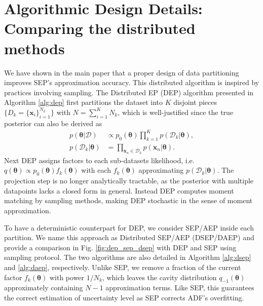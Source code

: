 \documentclass{article} %
\begin{document}
\section{Algorithmic Design Details: Comparing the distributed methods}
We have shown in the main paper that a proper design of data partitioning improves SEP's approximation accuracy. This distributed algorithm is inspired by practices involving sampling. The Distributed EP (DEP) algorithm \cite{gelman:dep}\cite{xu:sms} presented in Algorithm \ref{alg:dep} first partitions the dataset into $K$ disjoint pieces $\{ D_k = \{\bm{x}_i\}_{i=1}^{N_k} \}$ with $N = \sum_{i=1}^K N_k$, which is well-justified since the true posterior can also be derived as
\begin{align}
p(\bm{\theta}|\mathcal{D}) &\propto p_0(\bm{\theta}) \prod_{k=1}^K p(\mathcal{D}_k|\bm{\theta}), \\
p(\mathcal{D}_k|\bm{\theta}) &= \prod_{\bm{x}_n \in \mathcal{D}_k} p(\bm{x}_n | \bm{\theta}).
\end{align}
%
Next DEP assigns factors to each sub-datasets likelihood, i.e.~$q(\bm{\theta}) \propto p_0(\bm{\theta}) f_k(\bm{\theta})$ with each $f_k(\bm{\theta})$ approximating $p(\mathcal{D}_k|\bm{\theta})$. The projection step is no longer analytically tractable, as the posterior with multiple datapoints lacks a closed form in general. Instead DEP computes moment matching by sampling methods, making DEP stochastic in the sense of moment approximation. 

%
To have a deterministic counterpart for DEP, we consider SEP/AEP inside each partition. We name this approach as Distributed SEP/AEP (DSEP/DAEP) and provide a comparison in Fig. \ref{fig:dep_sep_dsep} with DEP and SEP using sampling protocol. The two algorithms are also detailed in Algorithm \ref{alg:dsep} and \ref{alg:daep}, respectively. Unlike SEP, we remove a fraction of the current factor $f_k(\bm{\theta})$ with power $1/N_k$, which leaves the cavity distribution $q_{-1}(\bm{\theta})$ approximately containing $N-1$ approximation terms. Like SEP, this guarantees the correct estimation of uncertainty level as SEP corrects ADF's overfitting. 
\end{document}
